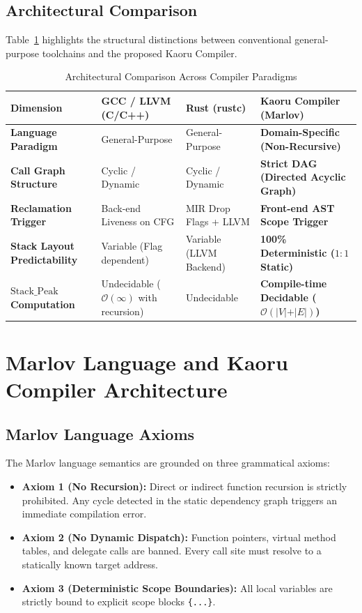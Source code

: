 \documentclass[conference]{IEEEtran}
\begin{document}
\subsection{Architectural Comparison}
Table~\ref{tab:comparison} highlights the structural distinctions between conventional general-purpose toolchains and the proposed Kaoru Compiler.

\begin{table}[htbp]
\caption{Architectural Comparison Across Compiler Paradigms}
\label{tab:comparison}
\centering
\begin{tabular}{p{3.2cm}p{4cm}p{4cm}p{4.8cm}}
\toprule
\textbf{Dimension} & \textbf{GCC / LLVM (C/C++)} & \textbf{Rust (rustc)} & \textbf{Kaoru Compiler (Marlov)} \\
\midrule
\textbf{Language Paradigm} & General-Purpose & General-Purpose & \textbf{Domain-Specific (Non-Recursive)} \\
\textbf{Call Graph Structure} & Cyclic / Dynamic & Cyclic / Dynamic & \textbf{Strict DAG (Directed Acyclic Graph)} \\
\textbf{Reclamation Trigger} & Back-end Liveness on CFG & MIR Drop Flags + LLVM & \textbf{Front-end AST Scope Trigger} \\
\textbf{Stack Layout Predictability} & Variable (Flag dependent) & Variable (LLVM Backend) & \textbf{100\% Deterministic ($1:1$ Static)} \\
\textbf{$\mathrm{Stack}\_{\mathrm{Peak}}$ Computation} & Undecidable ($\mathcal{O}(\infty)$ with recursion) & Undecidable & \textbf{Compile-time Decidable ($\mathcal{O}(\vert{}V\vert{} + \vert{}E\vert{})$)} \\
\bottomrule
\end{tabular}
\end{table}

\section{Marlov Language and Kaoru Compiler Architecture}

\subsection{Marlov Language Axioms}
The Marlov language semantics are grounded on three grammatical axioms:
\begin{itemize}
    \item \textbf{Axiom 1 (No Recursion):} Direct or indirect function recursion is strictly prohibited. Any cycle detected in the static dependency graph triggers an immediate compilation error.
    \item \textbf{Axiom 2 (No Dynamic Dispatch):} Function pointers, virtual method tables, and delegate calls are banned. Every call site must resolve to a statically known target address.
    \item \textbf{Axiom 3 (Deterministic Scope Boundaries):} All local variables are strictly bound to explicit scope blocks \texttt{\{...\}}.
\end{itemize}
\end{document}
